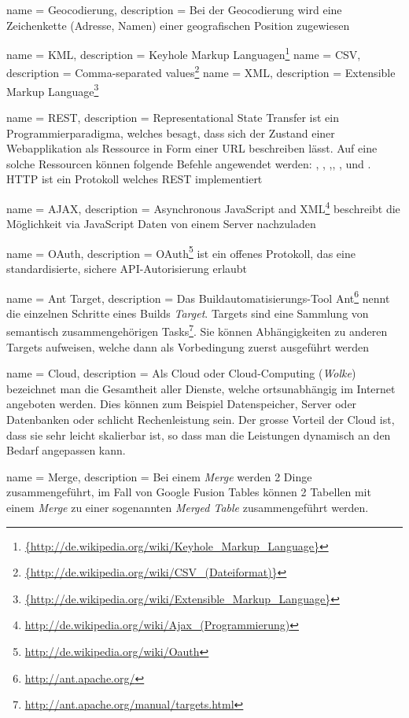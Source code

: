  {
	name = Geocodierung,
	description = {Bei der Geocodierung wird eine Zeichenkette (Adresse, Namen) einer geografischen Position zugewiesen}
}

 {
	name = KML,
	description = {Keyhole Markup Languagen\footnote{\url{{http://de.wikipedia.org/wiki/Keyhole_Markup_Language}}}}
}
 {
	name = CSV,
	description = {Comma-separated values\footnote{\url{{http://de.wikipedia.org/wiki/CSV_(Dateiformat)}}}}
}
 {
	name = XML,
	description = {Extensible Markup Language\footnote{\url{{http://de.wikipedia.org/wiki/Extensible_Markup_Language}}}}
}


 {
	name = REST,
	description = {Representational State Transfer\cite{rest} ist ein Programmierparadigma, welches besagt, dass sich der Zustand einer Webapplikation als Ressource in Form einer URL beschreiben lässt. Auf eine solche Ressourcen können folgende Befehle angewendet werden: , , ,, ,  und . HTTP ist ein Protokoll welches REST implementiert}
}

 {
	name = AJAX,
	description = {Asynchronous JavaScript and XML\footnote{\url{http://de.wikipedia.org/wiki/Ajax_(Programmierung)}} beschreibt die Möglichkeit via JavaScript Daten von einem Server nachzuladen}
}

 {
	name = OAuth,
	description = {OAuth\footnote{\url{http://de.wikipedia.org/wiki/Oauth}} ist ein offenes Protokoll, das eine standardisierte, sichere API-Autorisierung erlaubt}
}

 {
	name = Ant Target,
	description = {Das Buildautomatisierungs-Tool Ant\footnote{\url{http://ant.apache.org/}} nennt die einzelnen Schritte eines Builds \emph{Target}. Targets sind eine Sammlung von semantisch zusammengehörigen Tasks\footnote{\url{http://ant.apache.org/manual/targets.html}}. Sie können Abhängigkeiten zu anderen Targets aufweisen, welche dann als Vorbedingung zuerst ausgeführt werden}
}

 {
	name = Cloud,
	description = {Als Cloud oder Cloud-Computing (\emph{Wolke}) bezeichnet man die Gesamtheit aller Dienste, welche ortsunabhängig im Internet angeboten werden. Dies können zum Beispiel Datenspeicher, Server oder Datenbanken oder schlicht Rechenleistung sein. Der grosse Vorteil der Cloud ist, dass sie sehr leicht skalierbar ist, so dass man  die Leistungen dynamisch an den Bedarf angepassen kann.\cite{cloud}}
}

 {
	name = Merge,
	description = {Bei einem \emph{Merge} werden 2 Dinge zusammengeführt, im Fall von Google Fusion Tables können 2 Tabellen mit einem \emph{Merge} zu einer sogenannten \emph{Merged Table} zusammengeführt werden.}
}
